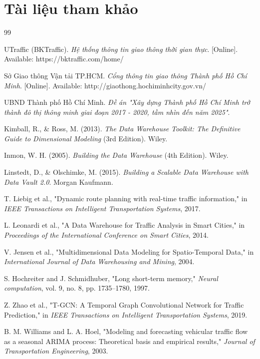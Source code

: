 \section{Tài liệu tham khảo}
\begin{thebibliography}{99}

UTraffic (BKTraffic). \textit{Hệ thống thông tin giao thông thời gian thực}. [Online]. Available: https://bktraffic.com/home/

Sở Giao thông Vận tải TP.HCM. \textit{Cổng thông tin giao thông Thành phố Hồ Chí Minh}. [Online]. Available: http://giaothong.hochiminhcity.gov.vn/

UBND Thành phố Hồ Chí Minh. \textit{Đề án "Xây dựng Thành phố Hồ Chí Minh trở thành đô thị thông minh giai đoạn 2017 - 2020, tầm nhìn đến năm 2025"}.

Kimball, R., \& Ross, M. (2013). \textit{The Data Warehouse Toolkit: The Definitive Guide to Dimensional Modeling} (3rd Edition). Wiley.

Inmon, W. H. (2005). \textit{Building the Data Warehouse} (4th Edition). Wiley.

Linstedt, D., \& Olschimke, M. (2015). \textit{Building a Scalable Data Warehouse with Data Vault 2.0}. Morgan Kaufmann.

T. Liebig et al., "Dynamic route planning with real-time traffic information," in \textit{IEEE Transactions on Intelligent Transportation Systems}, 2017.

L. Leonardi et al., "A Data Warehouse for Traffic Analysis in Smart Cities," in \textit{Proceedings of the International Conference on Smart Cities}, 2014.

V. Jensen et al., "Multidimensional Data Modeling for Spatio-Temporal Data," in \textit{International Journal of Data Warehousing and Mining}, 2004.

S. Hochreiter and J. Schmidhuber, "Long short-term memory," \textit{Neural computation}, vol. 9, no. 8, pp. 1735–1780, 1997.

Z. Zhao et al., "T-GCN: A Temporal Graph Convolutional Network for Traffic Prediction," in \textit{IEEE Transactions on Intelligent Transportation Systems}, 2019.

B. M. Williams and L. A. Hoel, "Modeling and forecasting vehicular traffic flow as a seasonal ARIMA process: Theoretical basis and empirical results," \textit{Journal of Transportation Engineering}, 2003.


\end{thebibliography}

